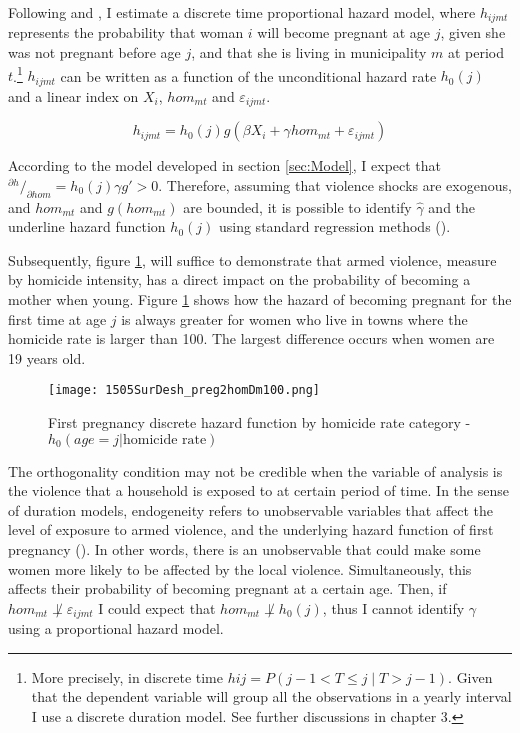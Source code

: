 \documentclass[a4paper,10pt,twocolumn,preprint,3p,authoryear]{elsarticle}
\newcommand*\rfrac[2]{{}^{#1}\!/_{#2}}
\begin{document}
Following \citet{Lancaster1979} and \citet{Jenkins2005}, I estimate a discrete time proportional hazard model, where $h_{ijmt}$ represents the probability that woman $i$ will become pregnant at age $j$, given she was not pregnant before age $j$, and that she is living in municipality $m$ at period $t$.\footnote{More precisely, in discrete time $hij=P\left(j-1<T\leq j\mid T>j-1\right)$. Given that the dependent variable will group all the observations in a yearly interval I use a discrete duration model. See further discussions in \citet{Jenkins2005} chapter 3.} $h_{ijmt}$ can be written as a function of the unconditional hazard rate $h_{0}\left(j\right)$ and a linear index on $X_{i}$, $hom_{mt}$ and $\varepsilon_{ijmt}$.

	\begin{equation}
		h_{ijmt}=h_{0}\left(j\right)g\left(\beta X_{i}+\gamma hom_{mt}+\varepsilon_{ijmt}\right)\label{eq:Duration}
	\end{equation}

According to the model developed in section \ref{sec:Model}, I expect that $\rfrac{\partial h}{\partial hom}=h_{0}\left(j\right)\gamma g'>0$. Therefore, assuming that violence shocks are exogenous, and $hom_{mt}$ and $g\left(hom_{mt}\right)$ are bounded, it is possible to identify $\hat{\gamma}$ and the underline hazard function $h_{0}\left(j\right)$ using standard regression methods (\citet{VanDenBerg2000}). 

Subsequently, figure \ref{fig:DishDesPreg2ByHomDm100}, will suffice to demonstrate that armed violence, measure by homicide intensity, has a direct impact on the probability of becoming a mother when young. Figure \ref{fig:DishDesPreg2ByHomDm100} shows how the hazard of becoming pregnant for the first time at age $j$ is always greater for women who live in towns where the homicide rate is larger than 100. The largest difference occurs when women are 19 years old.

	\begin{figure}[h]
		\centering
		\texttt{[image: 1505SurDesh\_preg2homDm100.png]}
		\caption{First pregnancy discrete hazard function by homicide rate category - $h_{0}\left( age = j | \textrm{homicide rate} \right)$}
		\label{fig:DishDesPreg2ByHomDm100}
	\end{figure}

The orthogonality condition may not be credible when the variable of analysis is the violence that a household is exposed to at certain period of time. In the sense of duration models, endogeneity refers to unobservable variables that affect the level of exposure to armed violence, and the underlying hazard function of first pregnancy (\citet{Bijwaard2008}). In other words, there is an unobservable that could make some women more likely to be affected by the local violence.  Simultaneously, this affects their probability of becoming pregnant at a certain age. Then, if $hom_{mt}\not\perp\varepsilon_{ijmt}$ I could expect that $hom_{mt}\not\perp h_{0}\left(j\right)$, thus I cannot identify $\gamma$ using a proportional hazard model.
\end{document}
